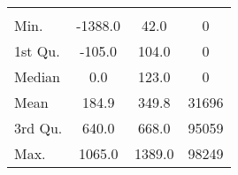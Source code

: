 \begin{tabular}{lS[table-format=5.1]S[table-format=5.1]S[table-format=5.1]}
&  &  &  \\
 Min.    & -1388.0 & 42.0 & 0 \\
 1st Qu. & -105.0 & 104.0 & 0 \\
 Median  & 0.0 & 123.0 & 0 \\
 Mean    & 184.9 & 349.8 & 31696 \\
 3rd Qu. & 640.0 & 668.0 & 95059 \\
 Max.    & 1065.0 & 1389.0 & 98249 \\
\end{tabular}
